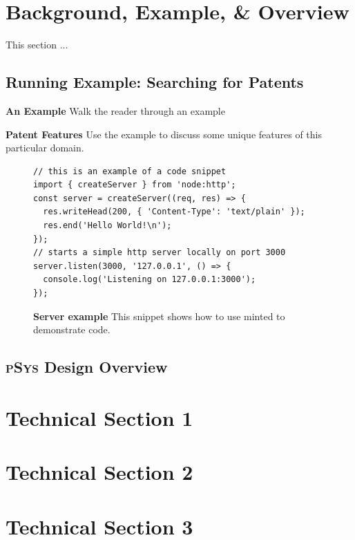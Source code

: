 \documentclass[sigplan, review, screen, 10pt]{acmart}
\newcommand{\sys}{{\scshape pSys}\xspace}
\begin{document}
\section{Background, Example, \& Overview}
\label{bg}

This section ...

\subsection{Running Example: Searching for Patents}
\label{bg:patents}

\textbf{An Example} Walk the reader through an example

\textbf{Patent Features}
Use the example to discuss some unique features of this particular domain.

\begin{figure}[t]
\centering
\begin{verbatim}
// this is an example of a code snippet
import { createServer } from 'node:http';
const server = createServer((req, res) => {
  res.writeHead(200, { 'Content-Type': 'text/plain' });
  res.end('Hello World!\n');
});
// starts a simple http server locally on port 3000
server.listen(3000, '127.0.0.1', () => {
  console.log('Listening on 127.0.0.1:3000');
});
\end{verbatim}
\caption{
  \textbf{Server example}
  This snippet shows how to use minted to demonstrate code.
}
\label{fig:example}
\end{figure}

\subsection{\sys Design Overview}
\label{bg:overview}

\section{Technical Section 1}
\label{one}

\section{Technical Section 2}
\label{two}

\section{Technical Section 3}
\label{three}
\end{document}
